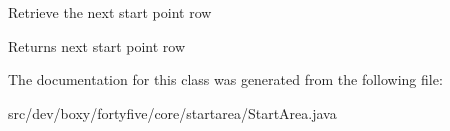 \label{d0/daf/classdev_1_1boxy_1_1fortyfive_1_1core_1_1startarea_1_1_start_area_a24c05993ff1fe53a2f8fe4cedfe3e333}
Retrieve the next start point row \begin{DoxyReturn}{Returns}
next start point row 
\end{DoxyReturn}


The documentation for this class was generated from the following file:\begin{DoxyCompactItemize}
\item 
src/dev/boxy/fortyfive/core/startarea/StartArea.java\end{DoxyCompactItemize}
